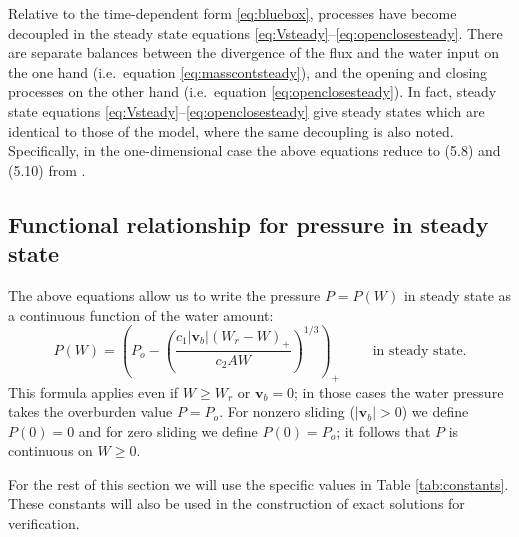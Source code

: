 \documentclass[11pt,final]{amsart}%
\newcommand\bv{\mathbf{v}}
\begin{document}
Relative to the time-dependent form \eqref{eq:bluebox}, processes have become decoupled in the steady state equations \eqref{eq:Vsteady}--\eqref{eq:openclosesteady}.  There are separate balances between the divergence of the flux and the water input on the one hand (i.e.~equation \eqref{eq:masscontsteady}), and the opening and closing processes on the other hand (i.e.~equation \eqref{eq:openclosesteady}).  In fact, steady state equations \eqref{eq:Vsteady}--\eqref{eq:openclosesteady} give steady states which are identical to those of the \cite{Schoofetal2012} model, where the same decoupling is also noted.  Specifically, in the one-dimensional case the above equations reduce to (5.8) and (5.10) from \cite{Schoofetal2012}.

\subsection*{Functional relationship for pressure in steady state}  The above equations allow us to write the pressure $P=P(W)$ in steady state as a continuous function of the water amount:
\begin{equation}
P(W) = \left(P_o - \left(\frac{c_1 |\bv_b| (W_r - W)_+}{c_2 A W}\right)^{1/3}\right)_+ \qquad \text{ in steady state}.  \label{eq:PofWsteady}
\end{equation}
This formula applies even if $W\ge W_r$ or $\bv_b=0$; in those cases the water pressure takes the overburden value $P = P_o$.  For nonzero sliding ($|\bv_b|>0$) we define $P(0)=0$ and for zero sliding we define $P(0)=P_o$; it follows that $P$ is continuous on $W\ge 0$.

For the rest of this section we will use the specific values in Table \ref{tab:constants}.  These constants will also be used in the construction of exact solutions for verification.
\end{document}
